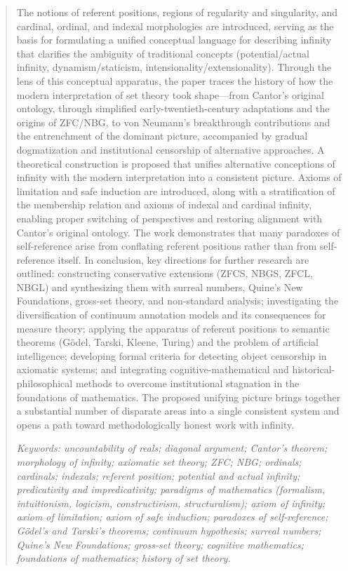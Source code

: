 \documentclass[12pt]{article}
\begin{document}
\begin{abstract}
The notions of referent positions, regions of regularity and singularity, and cardinal, ordinal, and indexal morphologies are introduced, serving as the basis for formulating a unified conceptual language for describing infinity that clarifies the ambiguity of traditional concepts (potential/actual infinity, dynamism/staticism, intensionality/extensionality). Through the lens of this conceptual apparatus, the paper traces the history of how the modern interpretation of set theory took shape—from Cantor’s original ontology, through simplified early-twentieth-century adaptations and the origins of ZFC/NBG, to von Neumann’s breakthrough contributions and the entrenchment of the dominant picture, accompanied by gradual dogmatization and institutional censorship of alternative approaches. A theoretical construction is proposed that unifies alternative conceptions of infinity with the modern interpretation into a consistent picture. Axioms of limitation and safe induction are introduced, along with a stratification of the membership relation and axioms of indexal and cardinal infinity, enabling proper switching of perspectives and restoring alignment with Cantor’s original ontology. The work demonstrates that many paradoxes of self-reference arise from conflating referent positions rather than from self-reference itself. In conclusion, key directions for further research are outlined: constructing conservative extensions (ZFCS, NBGS, ZFCL, NBGL) and synthesizing them with surreal numbers, Quine’s New Foundations, gross-set theory, and non-standard analysis; investigating the diversification of continuum annotation models and its consequences for measure theory; applying the apparatus of referent positions to semantic theorems (Gödel, Tarski, Kleene, Turing) and the problem of artificial intelligence; developing formal criteria for detecting object censorship in axiomatic systems; and integrating cognitive-mathematical and historical-philosophical methods to overcome institutional stagnation in the foundations of mathematics. The proposed unifying picture brings together a substantial number of disparate areas into a single consistent system and opens a path toward methodologically honest work with infinity.

{\it Keywords: uncountability of reals; diagonal argument; Cantor’s theorem; morphology of infinity; axiomatic set theory; ZFC; NBG; ordinals; cardinals; indexals; referent position; potential and actual infinity; predicativity and impredicativity; paradigms of mathematics (formalism, intuitionism, logicism, constructivism, structuralism); axiom of infinity; axiom of limitation; axiom of safe induction; paradoxes of self-reference; Gödel’s and Tarski’s theorems; continuum hypothesis; surreal numbers; Quine’s New Foundations; gross-set theory; cognitive mathematics; foundations of mathematics; history of set theory.}

\end{abstract}
\end{document}

